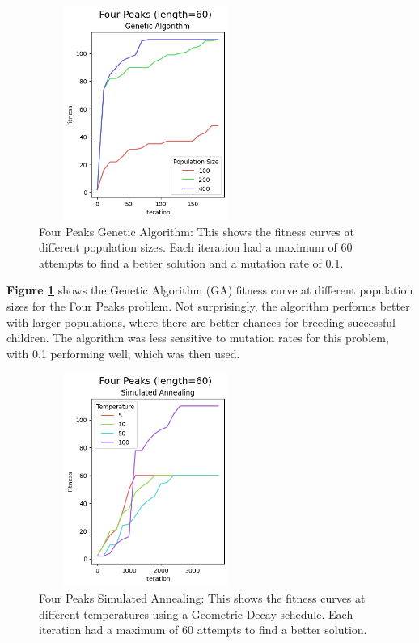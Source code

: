 \documentclass[letterpaper]{article} %
\begin{document}
\begin{figure}[htb]
\centering
\includegraphics[width=2.75in, height=2.75in]{figures/Four_Peaks_length=60_Genetic_Algorithm_l_60_ma_60_p_100__200__400_mu_0.1_.png}
\caption{Four Peaks Genetic Algorithm:  This shows the fitness curves at different population sizes. Each iteration had a maximum of 60 attempts to find a better solution and a mutation rate of 0.1. }
\label{fig:four_peaks_ga}
\end{figure}

 \textbf{Figure \ref{fig:four_peaks_ga}} shows the Genetic Algorithm (GA) fitness curve at different population sizes for the Four Peaks problem.  Not surprisingly, the algorithm performs better with larger populations, where there are better chances for breeding successful children.  The algorithm was less sensitive to mutation rates for this problem, with 0.1 performing well, which was then used.

\begin{figure}[htb]
\centering
\includegraphics[width=2.75in, height=2.75in]{figures/Four_Peaks_length=60_Simulated_Annealing_l_60_ma_360_d_geom_t_5__10__50__100_.png}
\caption{Four Peaks Simulated Annealing:  This shows the fitness curves at different temperatures using a Geometric Decay schedule. Each iteration had a maximum of 60 attempts to find a better solution. }
\label{fig:four_peaks_sa}
\end{figure}
\end{document}
